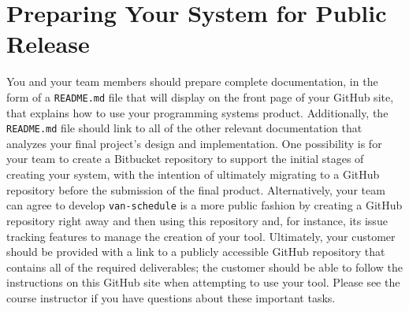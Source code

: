 \vspace*{-.05in}
\section*{Preparing Your System for Public Release}

You and your team members should prepare complete documentation, in the form of a {\tt README.md} file that will display
on the front page of your GitHub site, that explains how to use your programming systems product. Additionally, the {\tt
README.md} file should link to all of the other relevant documentation that analyzes your final project's design and
implementation. One possibility is for your team to create a Bitbucket repository to support the initial stages of
creating your system, with the intention of ultimately migrating to a GitHub repository before the submission of the
final product. Alternatively, your team can agree to develop {\tt van-schedule} is a more public fashion by creating a
GitHub repository right away and then using this repository and, for instance, its issue tracking features to manage the
creation of your tool. Ultimately, your customer should be provided with a link to a publicly accessible GitHub
repository that contains all of the required deliverables; the customer should be able to follow the instructions on
this GitHub site when attempting to use your tool. Please see the course instructor if you have questions about these
important tasks.


